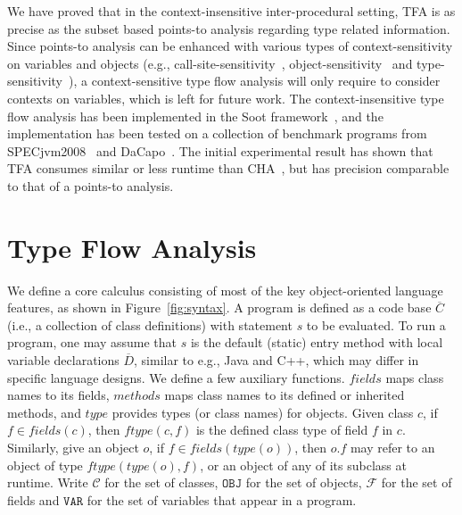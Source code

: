 \documentclass{llncs}
\newcommand{\keyword}[1]{\mathsf{#1}}
\newcommand{\kwnull}[0]{\keyword{null}}
\newcommand\Var{\mathtt{VAR}}
\newcommand\Val{\mathtt{V}}
\newcommand\Obj{\mathtt{OBJ}}
\newcommand{\Class}{\mathcal{C}}
\newcommand{\Field}{\mathcal{F}}
\newcommand\set[1]{\{#1\}}
\begin{document}
We have proved that in the context-insensitive inter-procedural setting, TFA is as precise as the subset based points-to analysis regarding type related information. Since points-to analysis can be enhanced with various types of context-sensitivity on variables and objects (e.g., call-site-sensitivity~\cite{Shivers91,Kastrinis2013}, object-sensitivity~\cite{Milanova2005,Smaragdakis11,Tan16} and type-sensitivity~\cite{Smaragdakis11}), a context-sensitive type flow analysis will only require to consider contexts on variables, which is left for future work. The context-insensitive type flow analysis has been implemented in the Soot framework~\cite{soot}, and the implementation has been tested on a collection of benchmark programs from SPECjvm2008~\cite{specjvm} and DaCapo~\cite{Blackburn2006}. %
The initial experimental result has shown that TFA consumes similar or less runtime than CHA~\cite{Dean1995}, but has precision comparable to that of a points-to analysis.

\section{Type Flow Analysis}\label{sec:type-flow-analysis}

We define a core calculus consisting of most of the key object-oriented language features, as shown in Figure~\ref{fig:syntax}.
A program is defined as a code base $\overline{C}$ (i.e., a collection of class definitions) with statement $s$ to be evaluated.
To run a program, one may assume that $s$ is the default (static) entry method with local variable declarations $\overline{D}$,
similar to e.g., Java and C++,
which may differ in specific language designs.
We define a few auxiliary functions. $fields$ maps class names to its fields, $methods$ maps class names to its defined or inherited methods, and $type$ provides types (or class names) for objects. Given class $c$, if $f\in fields(c)$, then $ftype(c,f)$ is the defined class type of field $f$ in $c$. Similarly, give an object $o$, if $f\in fields(type(o))$, then $o.f$ may refer to an object of type $ftype(type(o),f)$,
or an object of any of its subclass at runtime. Write $\Class$ for the set of classes, $\Obj$ for the set of objects, $\Field$ for the set of fields and $\Var$ for the set of variables that appear in a program.
\end{document}
